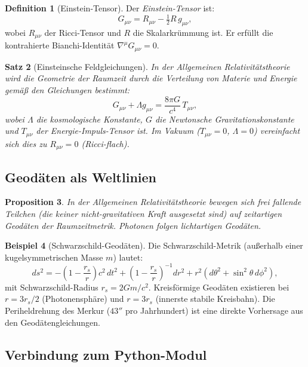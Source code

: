\documentclass[12pt,a4paper]{amsart}
\newtheorem{theorem}{Satz}[section]
\newtheorem{proposition}[theorem]{Proposition}
\theoremstyle{definition}
\newtheorem{definition}[theorem]{Definition}
\newtheorem{beispiel}[theorem]{Beispiel}
\begin{document}
\begin{definition}[Einstein-Tensor]
Der \emph{Einstein-Tensor} ist:
\[
  G_{\mu\nu} = R_{\mu\nu} - \tfrac{1}{2} R\,g_{\mu\nu},
\]
wobei $R_{\mu\nu}$ der Ricci-Tensor und $R$ die Skalarkrümmung ist.
Er erfüllt die kontrahierte Bianchi-Identität $\nabla^\mu G_{\mu\nu} = 0$.
\end{definition}

\begin{theorem}[Einsteinsche Feldgleichungen]
In der Allgemeinen Relativitätstheorie wird die Geometrie der Raumzeit durch
die Verteilung von Materie und Energie gemäß den Gleichungen bestimmt:
\[
  G_{\mu\nu} + \Lambda g_{\mu\nu} = \frac{8\pi G}{c^4}\,T_{\mu\nu},
\]
wobei $\Lambda$ die kosmologische Konstante, $G$ die Newtonsche Gravitationskonstante
und $T_{\mu\nu}$ der Energie-Impuls-Tensor ist. Im Vakuum ($T_{\mu\nu} = 0$,
$\Lambda = 0$) vereinfacht sich dies zu $R_{\mu\nu} = 0$ (\emph{Ricci-flach}).
\end{theorem}

\subsection{Geodäten als Weltlinien}

\begin{proposition}
In der Allgemeinen Relativitätstheorie bewegen sich frei fallende Teilchen
(die keiner nicht-gravitativen Kraft ausgesetzt sind) auf \emph{zeitartigen
Geodäten} der Raumzeitmetrik. Photonen folgen \emph{lichtartigen Geodäten}.
\end{proposition}

\begin{beispiel}[Schwarzschild-Geodäten]
Die Schwarzschild-Metrik (außerhalb einer kugelsymmetrischen Masse $m$) lautet:
\[
  ds^2 = -\left(1 - \frac{r_s}{r}\right)c^2\,dt^2
  + \left(1 - \frac{r_s}{r}\right)^{-1}dr^2
  + r^2(d\theta^2 + \sin^2\!\theta\,d\phi^2),
\]
mit Schwarzschild-Radius $r_s = 2Gm/c^2$. Kreisförmige Geodäten existieren
bei $r = 3r_s/2$ (Photonensphäre) und $r = 3r_s$ (innerste stabile Kreisbahn).
Die Periheldrehung des Merkur ($43''$ pro Jahrhundert) ist eine direkte
Vorhersage aus den Geodätengleichungen.
\end{beispiel}

\subsection{Verbindung zum Python-Modul}
\end{document}
